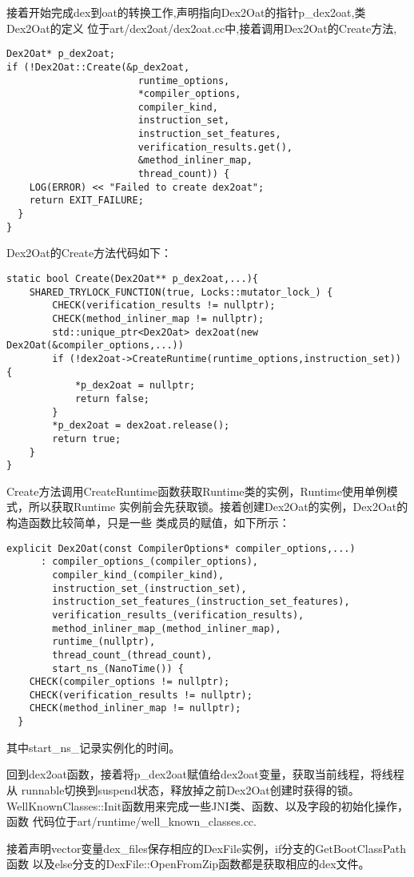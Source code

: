 接着开始完成dex到oat的转换工作,声明指向Dex2Oat的指针p\_dex2oat,类Dex2Oat的定义
位于art/dex2oat/dex2oat.cc中,接着调用Dex2Oat的Create方法,
\begin{lstlisting}
Dex2Oat* p_dex2oat;
if (!Dex2Oat::Create(&p_dex2oat,
                       runtime_options,
                       *compiler_options,
                       compiler_kind,
                       instruction_set,
                       instruction_set_features,
                       verification_results.get(),
                       &method_inliner_map,
                       thread_count)) {
    LOG(ERROR) << "Failed to create dex2oat";
    return EXIT_FAILURE;
  }
}
\end{lstlisting}
Dex2Oat的Create方法代码如下：
\begin{lstlisting}
static bool Create(Dex2Oat** p_dex2oat,...){
	SHARED_TRYLOCK_FUNCTION(true, Locks::mutator_lock_) {
		CHECK(verification_results != nullptr);
		CHECK(method_inliner_map != nullptr);
		std::unique_ptr<Dex2Oat> dex2oat(new  Dex2Oat(&compiler_options,...))
		if (!dex2oat->CreateRuntime(runtime_options,instruction_set)) {
			*p_dex2oat = nullptr;
			return false;
		}
		*p_dex2oat = dex2oat.release();
		return true;
	}
}
\end{lstlisting}
Create方法调用CreateRuntime函数获取Runtime类的实例，Runtime使用单例模式，所以获取Runtime
实例前会先获取锁。接着创建Dex2Oat的实例，Dex2Oat的构造函数比较简单，只是一些
类成员的赋值，如下所示：
\begin{lstlisting}
explicit Dex2Oat(const CompilerOptions* compiler_options,...)
      : compiler_options_(compiler_options),
        compiler_kind_(compiler_kind),
        instruction_set_(instruction_set),
        instruction_set_features_(instruction_set_features),
        verification_results_(verification_results),
        method_inliner_map_(method_inliner_map),
        runtime_(nullptr),
        thread_count_(thread_count),
        start_ns_(NanoTime()) {
    CHECK(compiler_options != nullptr);
    CHECK(verification_results != nullptr);
    CHECK(method_inliner_map != nullptr);
  }
\end{lstlisting}
其中start\_ns\_记录实例化的时间。

回到dex2oat函数，接着将p\_dex2oat赋值给dex2oat变量，获取当前线程，将线程从
runnable切换到suspend状态，释放掉之前Dex2Oat创建时获得的锁。
WellKnownClasses::Init函数用来完成一些JNI类、函数、以及字段的初始化操作，函数
代码位于art/runtime/well\_known\_classes.cc.

接着声明vector变量dex\_files保存相应的DexFile实例，if分支的GetBootClassPath函数
以及else分支的DexFile::OpenFromZip函数都是获取相应的dex文件。

